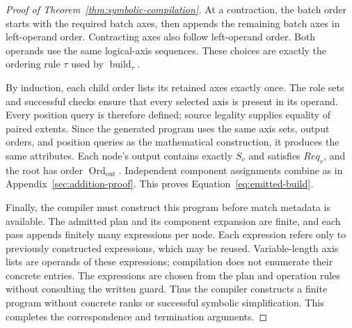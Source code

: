 \begin{proof}[Proof of Theorem~\ref{thm:symbolic-compilation}]
At a contraction, the batch order starts with the required batch axes,
then appends the remaining batch axes in left-operand order. Contracting
axes also follow left-operand order. Both operands use the same logical-axis
sequences. These choices are exactly the ordering rule $\tau$ used by
$\operatorname{build}_{\tau}$.

By induction, each child order lists its retained axes exactly once.
The role sets and successful checks ensure that every selected axis is
present in its operand. Every position query is therefore defined;
source legality supplies equality of paired extents. Since the generated
program uses the same axis sets, output orders, and position queries as the
mathematical construction, it produces the same attributes. Each node's
output contains exactly $S_v$ and satisfies $Req_v$, and the root has order
$\operatorname{Ord}_{\mathrm{out}}$. Independent component assignments combine as in
Appendix~\ref{sec:addition-proof}. This proves Equation~\eqref{eq:emitted-build}.

Finally, the compiler must construct this program before match metadata
is available. The admitted plan and its component expansion are finite,
and each pass appends finitely many expressions per node. Each expression
refers only to previously constructed expressions, which may be reused.
Variable-length axis lists are operands of these expressions; compilation
does not enumerate their concrete entries. The expressions are chosen from
the plan and operation rules without consulting the written guard. Thus
the compiler constructs a finite program without concrete ranks or
successful symbolic simplification. This completes the correspondence
and termination arguments.
\end{proof}
